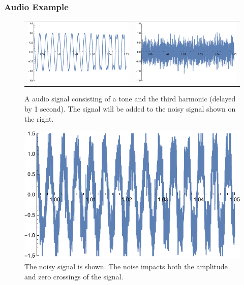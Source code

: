 \subsubsection{Audio Example}
\begin{figure}[tb]
\centering
\begin{tabular}{cc}
\includegraphics[width=.45\columnwidth]{tonesintime.pdf} &
\includegraphics[width=.45\columnwidth]{noiseonly.pdf} \\
\end{tabular}
\caption{A audio signal consisting of a tone and the third harmonic (delayed by 1 second).  The signal will be added to the noisy signal shown on the right.}
\label{fig:tones_time}
\end{figure}
\begin{figure}[tb]
\begin{center}
\includegraphics[width=.45\columnwidth]{signoise.pdf}
\end{center}
\caption{The noisy signal is shown.  The noise impacts both the amplitude and zero crossings of the signal.} \label{fig:sigplusnoise}
\end{figure}
